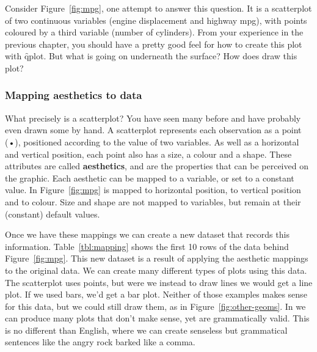 Consider Figure~\ref{fig:mpg}, one attempt to answer this question.  It is a scatterplot of two continuous variables (engine displacement and highway mpg), with points coloured by a third variable (number of cylinders).  From your experience in the previous chapter, you should have a pretty good feel for how to create this plot with \f{qplot}.  But what is going on underneath the surface?  How does \ggplot draw this plot? 

% 
% 


\subsubsection{Mapping aesthetics to data}

What precisely is a scatterplot? You have seen many before and have probably even drawn some by hand. A scatterplot represents each observation as a point (•), positioned according to the value of two variables. As well as a horizontal and vertical position, each point also has a size, a colour and a shape. These attributes are called {\bf aesthetics}, and are the properties that can be perceived on the graphic. Each aesthetic can be mapped to a variable, or set to a constant value. In Figure~\ref{fig:mpg}  is mapped to horizontal position,  to vertical position and  to colour. Size and shape are not mapped to variables, but remain at their (constant) default values. 

Once we have these mappings we can create a new dataset that records this information. Table~\ref{tbl:mapping} shows the first 10 rows of the data behind Figure~\ref{fig:mpg}. This new dataset is a result of applying the aesthetic mappings to the original data. We can create many different types of plots using this data. The scatterplot uses points, but were we instead to draw lines we would get a line plot. If we used bars, we'd get a bar plot. Neither of those examples makes sense for this data, but we could still draw them, as in Figure~\ref{fig:other-geoms}. In \ggplot we can produce many  plots that don't make sense, yet are grammatically valid.  This is no different than English, where we can create senseless but grammatical sentences like the angry rock barked like a comma.

